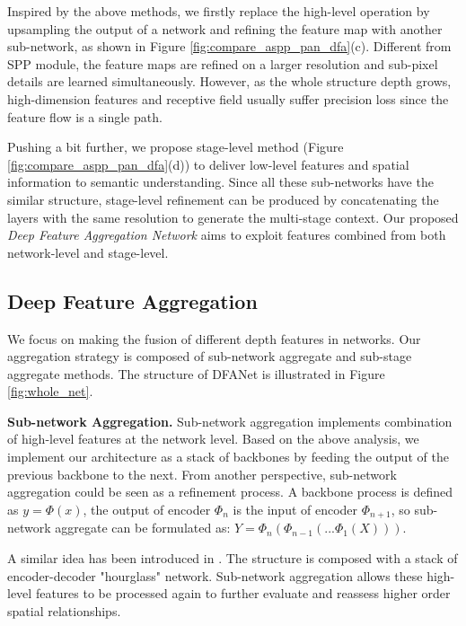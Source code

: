 \documentclass[10pt,twocolumn,letterpaper]{article}
\begin{document}
Inspired by the above methods, we firstly replace the high-level operation 
by upsampling the output of a network and refining the feature map with another sub-network, as shown in Figure \ref{fig:compare_aspp_pan_dfa}(c). Different from SPP module, the feature maps are refined on a larger resolution and sub-pixel details are learned simultaneously. 
However, as the whole structure depth grows, high-dimension features and receptive field usually suffer precision loss since the feature flow is a single path. 

Pushing a bit further, we propose stage-level method (Figure \ref{fig:compare_aspp_pan_dfa}(d)) to deliver low-level features and spatial information to semantic understanding. Since all these sub-networks have the similar structure, stage-level refinement can be produced by concatenating the layers with the same resolution to generate the multi-stage context. Our proposed \textit{Deep Feature Aggregation Network} aims to exploit features combined from both network-level and stage-level.













\subsection{Deep Feature Aggregation}

We focus on making the fusion of different depth features in networks. Our aggregation strategy is composed of sub-network aggregate and sub-stage aggregate methods. The structure of DFANet is illustrated in Figure \ref{fig:whole_net}.

\textbf{Sub-network Aggregation.} Sub-network aggregation implements combination of high-level features at the network level.
Based on the above analysis, we implement our architecture as a stack of backbones by feeding the output of the previous backbone to the next. From another perspective, sub-network aggregation could be seen as a refinement process. A backbone process is defined as $ y = \Phi(x)$, the output of encoder $\Phi_{n}$ is the input of encoder $\Phi_{n+1}$, so sub-network aggregate can be formulated as: $Y = \Phi_n(\Phi_{n -1}(...\Phi_{1}(X)))$.

A similar idea has been introduced in \cite{stack_hourglass}. The structure is composed with a stack of encoder-decoder "hourglass" network. Sub-network aggregation allows these high-level features to be processed again to further evaluate and reassess higher order spatial relationships.
\end{document}
